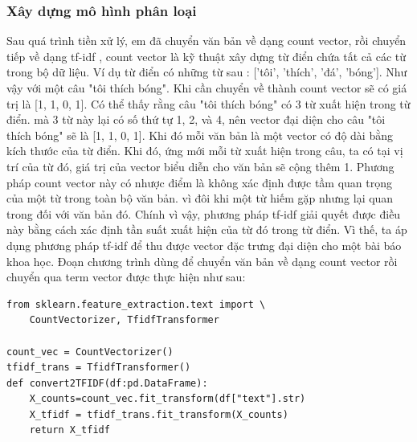 \documentclass[../DoAn.tex]{subfiles}
\begin{document}
\subsubsection{Xây dựng mô hình phân loại}
Sau quá trình tiền xử lý, em đã chuyển văn bản về dạng count vector, rồi chuyển tiếp về dạng tf-idf \cite{salton1975vector} , count vector là kỹ thuật xây dựng từ điển chứa tất cả các từ trong bộ dữ liệu. 
Ví dụ từ điển có những từ sau : ['tôi', 'thích', 'đá', 
'bóng']. Như vậy với một câu "tôi thích bóng". Khi cần chuyển về thành count vector sẽ có giá trị là [1, 1, 0, 1]. Có thể thấy rằng câu "tôi thích bóng" có 3 từ xuất hiện trong từ điển. mà 3 từ này lại có số thứ tự 1, 2, và 4, nên vector đại diện cho câu "tôi thích bóng" sẽ là [1, 1, 0, 1]. Khi đó mỗi văn bản là một vector có độ dài bằng kích thước của từ điển. Khi đó, ứng mới mỗi từ xuất hiện trong câu, ta có tại vị trí của từ đó, giá trị của vector biểu diễn cho văn bản sẽ cộng thêm 1. Phương pháp count vector này có nhược điểm là không xác định được tầm quan trọng của một từ trong toàn bộ văn bản. vì đôi khi một từ hiếm gặp nhưng lại quan trong đối với văn bản đó. Chính vì vậy, phương pháp tf-idf \cite{salton1975vector} giải quyết được điều này bằng cách xác định tần suất xuất hiện của từ đó trong từ điển. Vì thế, ta áp dụng phương pháp tf-idf để thu được vector đặc trưng đại diện cho một bài báo khoa học. Đoạn chương trình dùng để chuyển văn bản về dạng count vector rồi chuyển qua term vector được thực hiện như sau:

\begin{lstlisting}
from sklearn.feature_extraction.text import \
    CountVectorizer, TfidfTransformer
    
count_vec = CountVectorizer()
tfidf_trans = TfidfTransformer()
def convert2TFIDF(df:pd.DataFrame):
    X_counts=count_vec.fit_transform(df["text"].str)
    X_tfidf = tfidf_trans.fit_transform(X_counts)
    return X_tfidf
\end{lstlisting}
\end{document}
